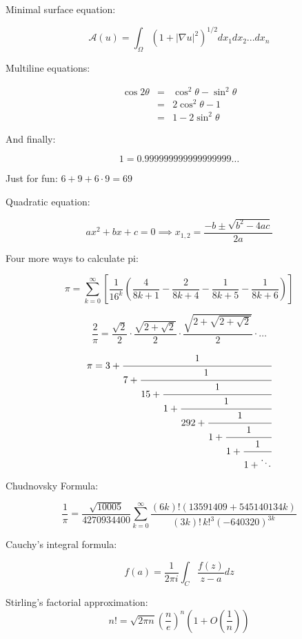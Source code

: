 \documentclass{article}
\begin{document}
Minimal surface equation:

$$\mathcal{A}(u)=\int_\Omega(1+|\nabla u|^2)^{1/2} dx_1 dx_2 ... dx_n$$ 

Multiline equations:

\begin{eqnarray*}
\cos{2\theta} & = & \cos^2\theta - \sin^2\theta \\
              & = & 2\cos^2\theta - 1 \\
              & = & 1 - 2\sin^2\theta
\end{eqnarray*}

And finally:

$$1=0.999999999999999999\ldots$$

Just for fun: $6 + 9 + 6 \cdot 9 = 69$

Quadratic equation:

\[
  ax^2+bx+c=0 \implies x_{1,2}=\frac{-b\pm\sqrt{b^2-4ac}}{2a}  
\]

Four more ways to calculate pi:

\begin{equation*}
  \pi=\sum_{k=0}^\infty\left[\frac{1}{16^k}\left(\frac{4}{8k+1}-\frac{2}{8k+4}-\frac{1}{8k+5}-\frac{1}{8k+6} \right) \right]
\end{equation*}

\begin{equation*}
  \frac{2}{\pi}=\frac{\sqrt{2}}{2}\cdot\frac{\sqrt{2+\sqrt{2}}}{2}\cdot\frac{\sqrt{2+\sqrt{2+\sqrt{2}}}}{2}\cdot\ldots
\end{equation*}

\begin{equation*}
\pi = 3+\textstyle \cfrac{1}{7+\textstyle \cfrac{1}{15+\textstyle \cfrac{1}{1+\textstyle \cfrac{1}{292+\textstyle \cfrac{1}{1+\textstyle \cfrac{1}{1+\textstyle \cfrac{1}{1+\ddots}}}}}}}
\end{equation*}

Chudnovsky Formula:

\[
\frac{1}{\pi} = \frac{\sqrt{10005}}{4270934400} \sum_{k=0}^\infty \frac{(6k)! (13591409 + 545140134k)}{(3k)!\,k!^3 (-640320)^{3k}}
\]

Cauchy's integral formula:

$$f(a)=\frac{1}{2\pi i}\int_{C} \frac{f(z)}{z-a} dz $$

Stirling's factorial approximation:
$$n! = \sqrt{2 \pi n} \left( \frac{n}{e} \right)^n \left( 1 + O \left( \frac{1}{n} \right) \right)$$
\end{document}
